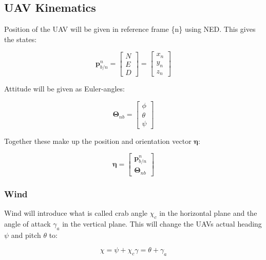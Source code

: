 \documentclass{article}
\begin{document}
\subsection*{UAV Kinematics}
Position of the UAV will be given in reference frame \{n\} using NED. This gives the states:

\begin{equation}
	\bm{p}^n_{b/n} =
	\begin{bmatrix}
		N \\ E \\ D
	\end{bmatrix}
	=
	\begin{bmatrix}
		x_n \\ y_n \\ z_n
	\end{bmatrix}
\end{equation}

Attitude will be given as Euler-angles:

\begin{equation}
	\bm{\Theta}_{nb} = 
	\begin{bmatrix}
		\phi \\ \theta \\ \psi
	\end{bmatrix}
\end{equation}

Together these make up the position and orientation vector $\bm{\eta}$:

\begin{equation}
	\bm{\eta} = 
	\begin{bmatrix}
		\bm{p}^n_{b/n} \\ \bm{\Theta}_{nb}
	\end{bmatrix}
\end{equation}

\subsubsection*{Wind}
Wind will introduce what is called crab angle $\chi_c$ in the horizontal plane and the angle of attack $\gamma_a$ in the vertical plane. This will change the UAVs actual heading $\psi$ and pitch $\theta$ to:

\begin{subequations}
\begin{equation}
	\chi = \psi + \chi_c
\end{equation}
\begin{equation}
	\gamma = \theta + \gamma_a
\end{equation}
\end{subequations}
	
\end{document}
